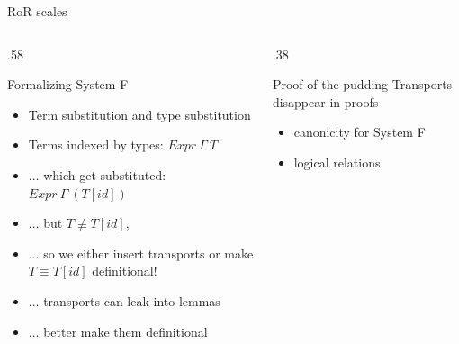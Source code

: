 \documentclass[pdftex,aspectratio=169]{beamer}
\begin{document}
\begin{frame}{RoR scales}
  \begin{columns}[T,onlytextwidth]
    \begin{column}{.58\textwidth}
  \begin{block}{Formalizing System F}
    \begin{itemize}
    \item Term substitution and type substitution
    \item Terms indexed by types: $Expr\ \Gamma\ T$
    \item $\dots$ which get substituted: $Expr\ \Gamma\ (T[id])$
    \item $\dots$ but $T \not\equiv T[id]$,
    \item $\dots$ so we either insert transports or make $T \equiv T[id]$
      definitional!
    \item $\dots$ transports can leak into lemmas
    \item $\dots$ better make them definitional
    \end{itemize}
  \end{block}
    \end{column}
    \begin{column}{.38\textwidth}
      \begin{block}{Proof of the pudding}
        Transports disappear in proofs
        \begin{itemize}
        \item canonicity for System F
        \item logical relations
        \end{itemize}
      \end{block}
    \end{column}
  \end{columns}



\end{frame}
\end{document}
